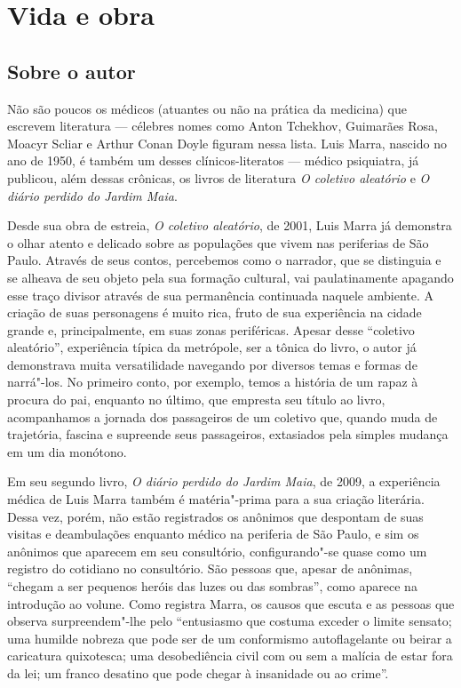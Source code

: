 \chapter{Vida e obra}

\linespread{1.15}

\section{Sobre o autor}

Não são poucos os médicos (atuantes ou não na prática da medicina) que escrevem literatura --- célebres nomes como Anton Tchekhov, Guimarães Rosa, Moacyr Scliar e Arthur Conan Doyle figuram nessa lista. Luis Marra, nascido no ano de 1950, é também um desses clínicos-literatos --- médico psiquiatra, já publicou, além dessas crônicas, os livros de literatura \textit{O coletivo aleatório} e \textit{O diário perdido do Jardim Maia}.

Desde sua obra de estreia, \textit{O coletivo aleatório}, de 2001, Luis Marra já demonstra o olhar atento e delicado sobre as populações que vivem nas periferias de São Paulo.
Através de seus contos, percebemos como o narrador, que se distinguia e se alheava de seu objeto pela sua formação cultural, vai paulatinamente apagando esse traço divisor através de sua permanência continuada naquele ambiente.
A criação de suas personagens é muito rica, fruto de sua experiência na cidade grande e, principalmente, em suas zonas periféricas. Apesar desse ``coletivo aleatório'', experiência  típica da metrópole, ser a tônica do livro, o autor já demonstrava muita versatilidade navegando por diversos temas e formas de narrá"-los. No primeiro conto, por exemplo, temos a história de um rapaz à procura do pai, enquanto no último, que empresta seu título ao livro, acompanhamos a jornada dos passageiros de um coletivo que, quando muda de trajetória, fascina e supreende seus passageiros, extasiados pela simples mudança em um dia monótono. 

Em seu segundo livro, \textit{O diário perdido do Jardim Maia}, de 2009, a experiência médica de Luis Marra também é matéria"-prima para a sua criação literária. Dessa vez, porém, não estão registrados os anônimos que despontam de suas visitas e deambulações enquanto médico na periferia de São Paulo, e sim os anônimos que aparecem em seu consultório, configurando"-se quase como um registro do cotidiano no consultório.
São pessoas que, apesar de anônimas, ``chegam a ser pequenos heróis das luzes ou das sombras'', como aparece na introdução ao volune. Como registra Marra, os causos que escuta e as pessoas que observa surpreendem"-lhe pelo ``entusiasmo que costuma exceder o limite sensato; uma humilde nobreza que pode ser de um conformismo autoflagelante ou beirar a caricatura quixotesca; uma desobediência civil com ou sem a malícia de estar fora da lei; um franco desatino que pode chegar à insanidade ou ao crime''.

